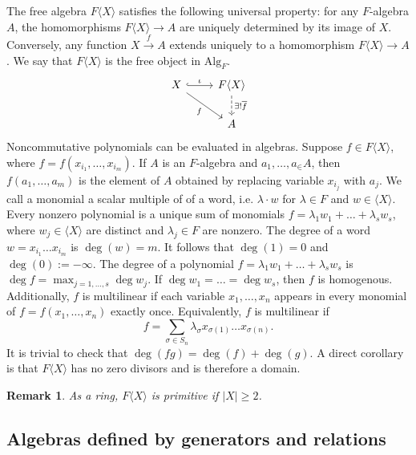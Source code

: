 \documentclass[10pt, a4paper]{article}
\newtheorem*{remark}{Remark}
\begin{document}
The free algebra $F\langle X \rangle$ satisfies the following universal property:
for any $F$-algebra $A$, the homomorphisms $F \langle X \rangle \to A$ are uniquely determined by 
its image of $X$. Conversely, any function $X \xrightarrow{f} A$ extends uniquely to a homomorphism $F\langle X\rangle \to A$.
We say that $F\langle X\rangle$ is the free object in $\mathrm{Alg}_F$.
\[\begin{tikzcd}
	X & {F \langle X\rangle} \\
	& A
	\arrow["f"', from=1-1, to=2-2]
	\arrow["\iota", hook, from=1-1, to=1-2]
	\arrow["{\exists!\overline{f}}", dashed, from=1-2, to=2-2]
\end{tikzcd}\]
Noncommutative polynomials can be evaluated in algebras. 
Suppose $f \in F \langle X \rangle$, where $f = f(x_{i_1}, \dots, x_{i_m})$.
If $A$ is an $F$-algebra and $a_1, \dots, a_ \in A$, then $f(a_1, \dots, a_m)$
is the element of $A$ obtained by replacing variable $x_{i_j}$ with $a_j$.
We call a monomial a scalar multiple of of a word, i.e. $\lambda \cdot w$ for 
$\lambda \in F$ and $w \in \langle X \rangle$. Every nonzero polynomial is a unique sum of monomials
$f =\lambda_1 w_1 + \dots + \lambda_s w_s$, where $w_j \in \langle X\rangle$ are distinct and $\lambda_j \in F$ are nonzero.
The degree of a word $w = x_{i_1} \dots x_{i_m}$ is $\deg(w) = m$. It follows that $\deg (1) = 0$
and $\deg(0) := - \infty$. The degree of a polynomial $f =\lambda_1 w_1 + \dots + \lambda_s w_s$ is $\deg f = \max_{j = 1, \dots, s} \deg w_j$.
If $\deg w_1 = \dots = \deg w_s$, then $f$ is homogenous. Additionally, $f$ is multilinear if each variable 
$x_1, \dots, x_n$ appears in every monomial of $f= f(x_1, \dots, x_n)$ exactly once. Equivalently, $f$ is multilinear if 
$$f = \sum_{\sigma \in S_n} \lambda_{\sigma} x_{\sigma(1)} \dots x_{\sigma(n)}.$$
It is trivial to check that $\deg (fg) = \deg(f) + \deg (g)$. A direct corollary is that $F \langle X \rangle$ has no zero divisors and is therefore a domain.

\begin{remark}
  As a ring, $F \langle X \rangle$ is primitive if $|X| \geq 2$.
\end{remark}

\subsection{Algebras defined by generators and relations}
\end{document}

